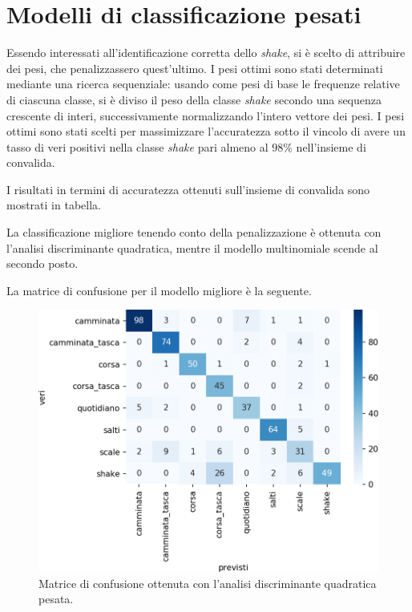 \documentclass[main.tex]{subfiles}
\begin{document}
\section{Modelli di classificazione pesati}

Essendo interessati all\rq{}identificazione corretta dello {\em shake}, si è scelto di attribuire dei pesi, che penalizzassero quest\rq{}ultimo. I pesi ottimi sono stati determinati mediante una ricerca sequenziale: usando come pesi di base le frequenze relative di ciascuna classe, si è diviso il peso della classe {\em shake} secondo una sequenza crescente di interi, successivamente normalizzando l'intero vettore dei pesi. I pesi ottimi sono stati scelti per massimizzare l\rq{}accuratezza sotto il vincolo di avere un tasso di veri positivi nella classe {\em shake} pari almeno al $98\%$ nell\rq{}insieme di convalida.

I risultati in termini di accuratezza ottenuti sull\rq{}insieme di convalida sono mostrati in tabella.


La classificazione migliore tenendo conto della penalizzazione è ottenuta con l\rq{}analisi discriminante quadratica, mentre il modello multinomiale scende al secondo posto.

La matrice di confusione per il modello migliore è la seguente.
\begin{figure}[H]
	\centering
	\includegraphics[width=\confusion]{../../figure/confusionMatrix-QDA-penalizzata.png}
	\caption{Matrice di confusione ottenuta con l'analisi discriminante quadratica pesata.}
	\label{fig:qda_pen}
\end{figure}
\end{document}
